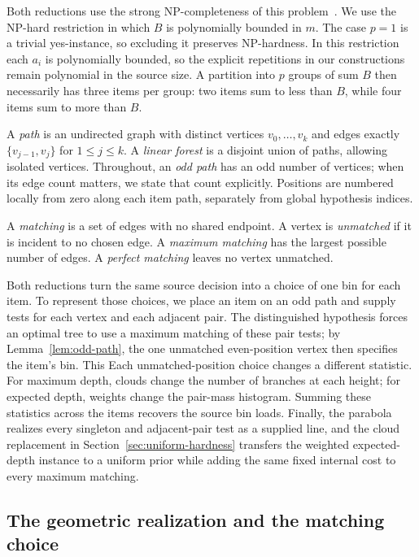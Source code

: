 Both reductions use the strong NP-completeness of this
problem~\cite{gj1979}.
We use the NP-hard restriction in which $B$ is polynomially bounded
in $m$. The case $p=1$ is a trivial yes-instance, so excluding it
preserves NP-hardness. In this restriction each $a_i$ is
polynomially bounded, so the explicit
repetitions in our constructions remain polynomial in the source
size. A partition into $p$ groups of sum $B$
then necessarily has three items per group: two items sum to less
than $B$, while four items sum to more than $B$.

\begin{definition}\label{def:paths-and-matchings}
A \emph{path} is an undirected graph with distinct vertices
$v_0,\ldots,v_k$ and edges exactly
$\{v_{j-1},v_j\}$ for $1\le j\le k$.
A \emph{linear forest} is a disjoint union of paths, allowing
isolated vertices. Throughout, an \emph{odd path} has an odd number
of vertices; when its edge count matters, we state that count
explicitly. Positions are numbered locally from zero along each item
path, separately from global hypothesis indices.

A \emph{matching} is a set of edges with no shared endpoint.
A vertex is \emph{unmatched} if it is incident to no chosen edge.
A \emph{maximum matching} has the largest possible number of edges.
A \emph{perfect matching} leaves no vertex unmatched.
\end{definition}

Both reductions turn the same source decision into a choice of one bin
for each item. To represent those choices, we place an item on an odd
path and supply tests for each vertex and each adjacent pair. The
distinguished hypothesis forces an optimal tree to use a maximum
matching of these pair tests; by Lemma~\ref{lem:odd-path}, the one
unmatched even-position vertex then specifies the item's bin. This
Each unmatched-position choice changes a different statistic. For
maximum depth, clouds change the number of branches at each height;
for expected depth, weights change the pair-mass histogram. Summing
these statistics across the items recovers the source bin loads.
Finally, the parabola realizes every singleton and adjacent-pair test
as a supplied line, and the cloud replacement in
Section~\ref{sec:uniform-hardness} transfers the weighted expected-depth
instance to a uniform prior while adding the same fixed internal cost
to every maximum matching.

\subsection{The geometric realization and the matching choice}

